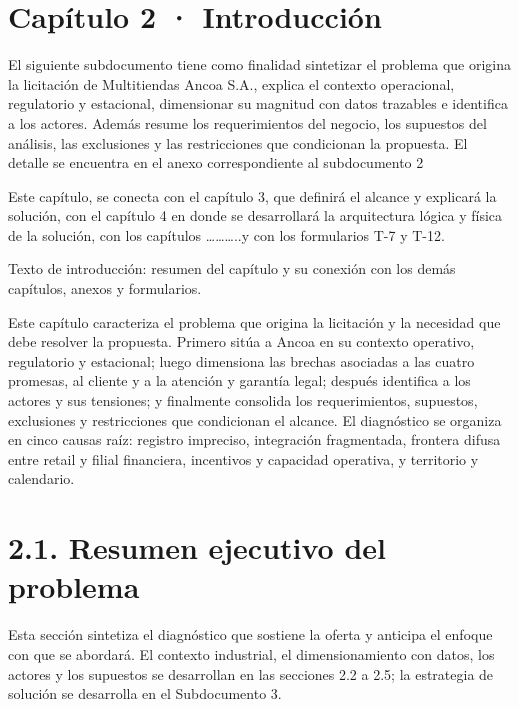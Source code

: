 \documentclass[11pt]{article}
\begin{document}
\tableofcontents
\clearpage

\section{Capítulo 2 · Introducción}\label{capuxedtulo-2-introducciuxf3n}

El siguiente subdocumento tiene como finalidad sintetizar el problema que origina la licitación de Multitiendas Ancoa S.A., explica el contexto operacional, regulatorio y estacional, dimensionar su magnitud con datos trazables e identifica a los actores. Además resume los requerimientos del negocio, los supuestos del análisis, las exclusiones y las restricciones que condicionan la propuesta. El detalle se encuentra en el anexo correspondiente al subdocumento 2

Este capítulo, se conecta con el capítulo 3, que definirá el alcance y explicará la solución, con el capítulo 4 en donde se desarrollará la arquitectura lógica y física de la solución, con los capítulos \ldots\ldots\ldots..y con los formularios T-7 y T-12.

Texto de introducción: resumen del capítulo y su conexión con los demás capítulos, anexos y formularios.

Este capítulo caracteriza el problema que origina la licitación y la necesidad que debe resolver la propuesta. Primero sitúa a Ancoa en su contexto operativo, regulatorio y estacional; luego dimensiona las brechas asociadas a las cuatro promesas, al cliente y a la atención y garantía legal; después identifica a los actores y sus tensiones; y finalmente consolida los requerimientos, supuestos, exclusiones y restricciones que condicionan el alcance. El diagnóstico se organiza en cinco causas raíz: registro impreciso, integración fragmentada, frontera difusa entre retail y filial financiera, incentivos y capacidad operativa, y territorio y calendario.

\section{2.1. Resumen ejecutivo del problema}\label{resumen-ejecutivo-del-problema}

Esta sección sintetiza el diagnóstico que sostiene la oferta y anticipa el enfoque con que se abordará. El contexto industrial, el dimensionamiento con datos, los actores y los supuestos se desarrollan en las secciones 2.2 a 2.5; la estrategia de solución se desarrolla en el Subdocumento 3.
\end{document}

